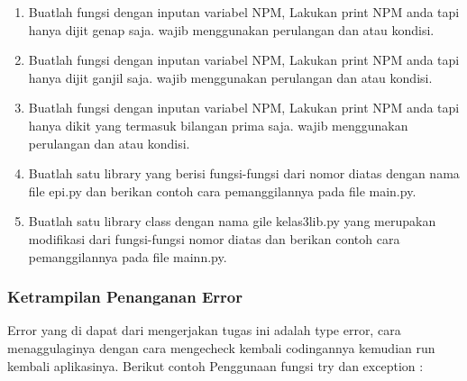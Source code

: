 \begin{enumerate}
    \item Buatlah fungsi dengan inputan variabel NPM, Lakukan print NPM anda tapi hanya dijit genap saja. wajib menggunakan perulangan dan atau kondisi.
        

    \item Buatlah fungsi dengan inputan variabel NPM, Lakukan print NPM anda tapi hanya dijit ganjil saja. wajib menggunakan perulangan dan atau kondisi.
        

    \item Buatlah fungsi dengan inputan variabel NPM, Lakukan print NPM anda tapi hanya dikit yang termasuk bilangan prima saja. wajib menggunakan perulangan dan atau kondisi.
        

    \item Buatlah satu library yang berisi fungsi-fungsi dari nomor diatas dengan nama file epi.py dan berikan contoh cara pemanggilannya pada file main.py.
        

    \item Buatlah satu library class dengan nama gile kelas3lib.py yang merupakan modifikasi dari fungsi-fungsi nomor diatas dan berikan contoh cara pemanggilannya pada file mainn.py.
        

\end{enumerate}

\subsubsection{Ketrampilan Penanganan Error}
Error yang di dapat dari mengerjakan tugas ini adalah type error, cara menaggulaginya dengan cara mengecheck kembali codingannya
kemudian run kembali aplikasinya. Berikut contoh Penggunaan fungsi try dan exception :


